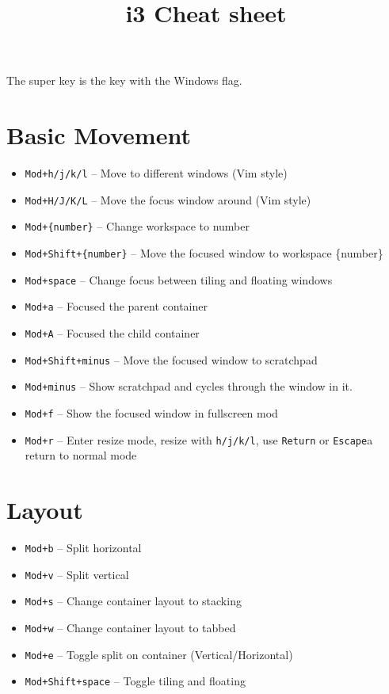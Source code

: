 \documentclass{article}
\title{i3 Cheat sheet}
\begin{document}
\maketitle
The super key is the key with the Windows flag. 

\section*{Basic Movement}
\begin{itemize}
	\item \verb|Mod+h/j/k/l| -- Move to different windows (Vim style)
	\item \verb|Mod+H/J/K/L| -- Move the focus window around (Vim style)
        \item \verb|Mod+{number}| -- Change workspace to number
	\item \verb|Mod+Shift+{number}| -- Move the focused window to workspace \{number\}
	\item \verb|Mod+space| -- Change focus between tiling and floating windows
	\item \verb|Mod+a| -- Focused the parent container 
	\item \verb|Mod+A| -- Focused the child container
	\item \verb|Mod+Shift+minus| -- Move the focused window to scratchpad 
	\item \verb|Mod+minus| -- Show scratchpad and cycles through the window in it.
	\item \verb|Mod+f| -- Show the focused window in fullscreen mod
	\item \verb|Mod+r| -- Enter resize mode, resize with \verb|h/j/k/l|, use \verb|Return| or \verb|Escape|a return to normal mode
\end{itemize}

\section*{Layout}

\begin{itemize}
	\item \verb|Mod+b| -- Split horizontal 
	\item \verb|Mod+v| -- Split vertical 
	\item \verb|Mod+s| -- Change container layout to stacking
	\item \verb|Mod+w| -- Change container layout to tabbed
	\item \verb|Mod+e| -- Toggle split on container (Vertical/Horizontal)
	\item \verb|Mod+Shift+space| -- Toggle tiling and floating
\end{itemize}
\end{document}
